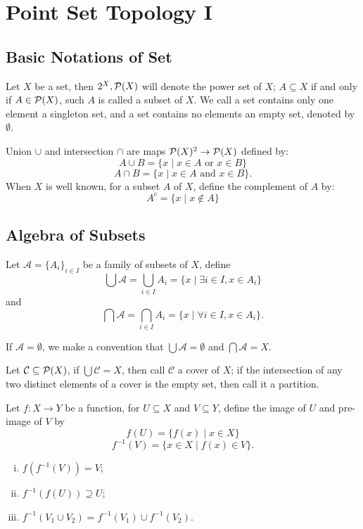 \section{Point Set Topology I}

\subsection{Basic Notations of Set}
Let $X$ be a set, then $2^X, \mathcal{P}(X)$ will denote the power set of $X$;
$A \subseteq X$ if and only if $A \in \mathcal{P}(X)$, such $A$ is called a subset of $X$.
We call a set contains only one element a singleton set,
and a set contains no elements an empty set, denoted by $\emptyset$.

Union $\cup$ and intersection $\cap$ are maps $\mathcal{P}(X)^2 \to \mathcal{P}(X)$ defined by:
$$A \cup B = \{x \mid x \in A\mbox{ or }x \in B\}$$
$$A \cap B = \{x \mid x \in A\mbox{ and }x \in B\}.$$
When $X$ is well known, for a subset $A$ of $X$, define the complement of $A$ by:
$$A^c = \{x \mid x \not\in A\}$$

\subsection{Algebra of Subsets}
\begin{defi}
Let $\mathcal{A} = \{A_i\}_{i \in I}$ be a family of subsets of $X$,
define
$$\bigcup \mathcal{A} = \bigcup_{i \in I} A_i = \{x \mid \exists i \in I, x \in A_i\}$$
and
$$\bigcap \mathcal{A} = \bigcap_{i \in I} A_i = \{x \mid \forall i \in I, x \in A_i\}.$$
\end{defi}
If $\mathcal{A} = \emptyset$, we make a convention that $\bigcup \mathcal{A} = \emptyset$
and $\bigcap \mathcal{A} = X$.

\begin{defi}
Let $\mathcal{C} \subseteq \mathcal{P}(X)$, if $\bigcup \mathcal{C} = X$, 
then call $\mathcal{C}$ a cover of $X$;
if the intersection of any two distinct elements of a cover is the empty set,
then call it a partition.
\end{defi}

Let $f : X \to Y$ be a function, for $U \subseteq X$ and $V \subseteq Y$,
define the image of $U$ and pre-image of $V$ by
$$f(U) = \{f(x) \mid x \in X\}$$
$$f^{-1}(V) = \{x \in X \mid f(x) \in V\}.$$

\begin{pro}
\begin{enumerate}[i).]
\item $f(f^{-1}(V)) = V$;
\item $f^{-1}(f(U)) \supseteq U$;
\item $f^{-1}(V_1 \cup V_2) = f^{-1}(V_1) \cup f^{-1}(V_2)$.
\end{enumerate}
\end{pro}

